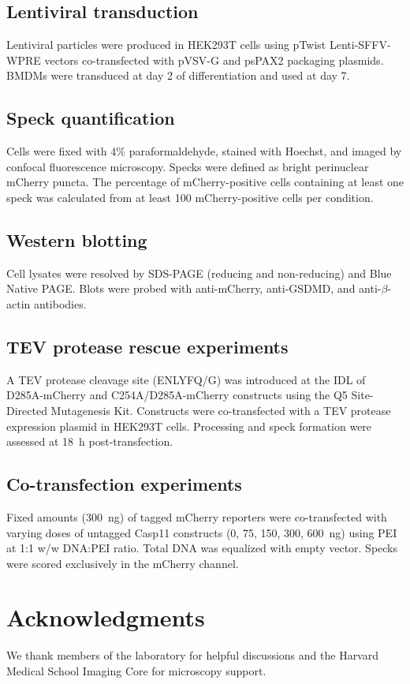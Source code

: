 \documentclass[11pt,a4paper]{article}
\begin{document}
\subsection{Lentiviral transduction}
Lentiviral particles were produced in HEK293T cells using pTwist Lenti-SFFV-WPRE vectors co-transfected with pVSV-G and psPAX2 packaging plasmids. BMDMs were transduced at day 2 of differentiation and used at day 7.

\subsection{Speck quantification}
Cells were fixed with 4\% paraformaldehyde, stained with Hoechst, and imaged by confocal fluorescence microscopy. Specks were defined as bright perinuclear mCherry puncta. The percentage of mCherry-positive cells containing at least one speck was calculated from at least 100 mCherry-positive cells per condition.

\subsection{Western blotting}
Cell lysates were resolved by SDS-PAGE (reducing and non-reducing) and Blue Native PAGE. Blots were probed with anti-mCherry, anti-GSDMD, and anti-$\beta$-actin antibodies.

\subsection{TEV protease rescue experiments}
A TEV protease cleavage site (ENLYFQ/G) was introduced at the IDL of D285A-mCherry and C254A/D285A-mCherry constructs using the Q5 Site-Directed Mutagenesis Kit. Constructs were co-transfected with a TEV protease expression plasmid in HEK293T cells. Processing and speck formation were assessed at 18~h post-transfection.

\subsection{Co-transfection experiments}
Fixed amounts (300~ng) of tagged mCherry reporters were co-transfected with varying doses of untagged Casp11 constructs (0, 75, 150, 300, 600~ng) using PEI at 1:1 w/w DNA:PEI ratio. Total DNA was equalized with empty vector. Specks were scored exclusively in the mCherry channel.

\section*{Acknowledgments}
We thank members of the laboratory for helpful discussions and the Harvard Medical School Imaging Core for microscopy support.


\end{document}
